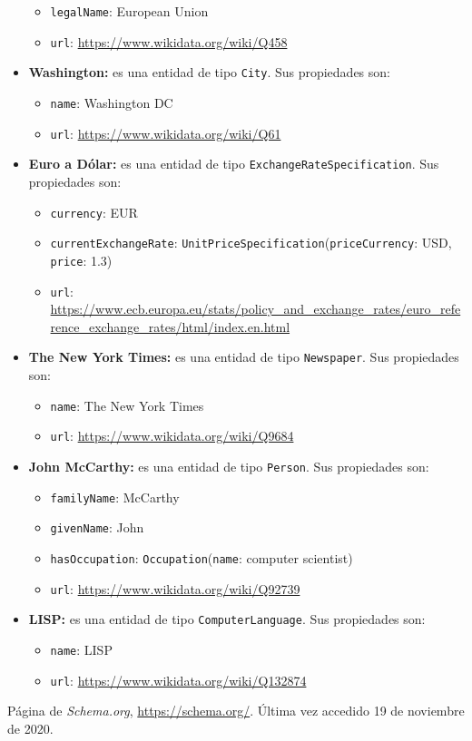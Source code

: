 \documentclass[11pt]{article}
\begin{document}
\begin{itemize}
\begin{itemize}
            \item \verb|legalName|: European Union
            \item \verb|url|: \url{https://www.wikidata.org/wiki/Q458}
        \end{itemize}
    \item \textbf{Washington:} es una entidad de tipo \verb|City|. Sus propiedades son:
        \begin{itemize}
            \item \verb|name|: Washington DC
            \item \verb|url|: \url{https://www.wikidata.org/wiki/Q61}
        \end{itemize}
    \item \textbf{Euro a Dólar:} es una entidad de tipo \verb|ExchangeRateSpecification|. Sus propiedades son:
        \begin{itemize}
            \item \verb|currency|: EUR
            \item \verb|currentExchangeRate|: \verb|UnitPriceSpecification|(\verb|priceCurrency|: USD, \verb|price|: 1.3)
            \item \verb|url|: \url{https://www.ecb.europa.eu/stats/policy_and_exchange_rates/euro_reference_exchange_rates/html/index.en.html}
        \end{itemize}
    \item \textbf{The New York Times:} es una entidad de tipo \verb|Newspaper|. Sus propiedades son:
        \begin{itemize}
            \item \verb|name|: The New York Times
            \item \verb|url|: \url{https://www.wikidata.org/wiki/Q9684}
        \end{itemize}
    \item \textbf{John McCarthy:} es una entidad de tipo \verb|Person|. Sus propiedades son:
        \begin{itemize}
            \item \verb|familyName|: McCarthy
            \item \verb|givenName|: John
            \item \verb|hasOccupation|: \verb|Occupation|(\verb|name|: computer scientist)
            \item \verb|url|: \url{https://www.wikidata.org/wiki/Q92739}
        \end{itemize}
    \item \textbf{LISP:} es una entidad de tipo \verb|ComputerLanguage|. Sus propiedades son:
        \begin{itemize}
            \item \verb|name|: LISP
            \item \verb|url|: \url{https://www.wikidata.org/wiki/Q132874}
        \end{itemize}
\end{itemize}
\begin{thebibliography}{8}
Página de \textit{Schema.org}, \url{https://schema.org/}. Última vez accedido 19 de noviembre de 2020.        
\end{thebibliography}
\end{document}
